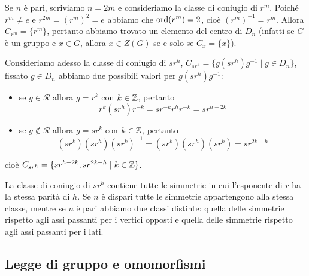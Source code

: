 \documentclass[11pt]{scrartcl}
\begin{document}
\begin{remark}
    Se $n$ è pari, scriviamo $n = 2m$ e consideriamo la classe di coniugio
    di $r^m$. Poiché $r^m \neq e$ e $r^{2m} = (r^m)^2 = e$ abbiamo che
    $\operatorname{ord}(r^m) = 2$, cioè $(r^m)^{-1} = r^m$. Allora $C_{r^m} = \{r^m\}$,
    pertanto abbiamo trovato un elemento del centro di $D_n$ (infatti se $G$
    è un gruppo e $x \in G$, allora $x \in Z(G)$ se e solo se $C_x = \{x\}$).
\end{remark}

Consideriamo adesso la classe di coniugio di $sr^h$, $C_{sr^h} = 
\{g(sr^h)g^{-1}\mid g\in D_n\}$, fissato $g \in D_n$ abbiamo due possibili
valori per $g(sr^h)g^{-1}$:
\begin{itemize}
    \item se $g \in \mathcal{R}$ allora $g = r^k$ con $k \in \mathbb Z$, pertanto
    \[
        r^k(sr^h)r^{-k} = sr^{-k}r^h r^{-k} = sr^{h - 2k}
    \]
    \item se $g \notin \mathcal{R}$ allora $g = sr^k$ con $k \in \mathbb Z$, pertanto
    \[
        (sr^k)(sr^h)(sr^k)^{-1} = (sr^k)(sr^h)(sr^k) = sr^{2k - h}
    \]
\end{itemize}
cioè $C_{sr^h} = \{sr^{h - 2k}, sr^{2k - h}\mid k \in \mathbb Z\}$. 

\begin{remark}
    La classe di coniugio di $sr^h$ contiene tutte le simmetrie in cui 
    l'esponente di $r$ ha la stessa parità di $h$. Se $n$ è 
    dispari tutte le simmetrie appartengono alla stessa classe,
    mentre se $n$ è pari abbiamo due classi distinte: quella 
    delle simmetrie rispetto agli assi passanti per i vertici opposti e quella 
    delle simmetrie rispetto agli assi passanti per i lati.
\end{remark}


\subsection{Legge di gruppo e omomorfismi}
\end{document}
